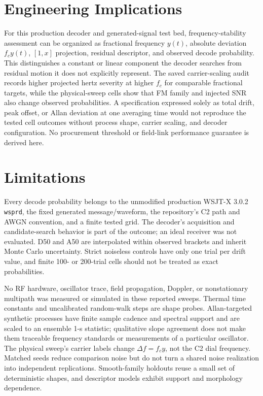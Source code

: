 \documentclass[conference]{IEEEtran}
\begin{document}
\section{Engineering Implications}
For this production decoder and generated-signal test bed, frequency-stability assessment can be organized as fractional frequency $y(t)$, absolute deviation $f_cy(t)$, $[1,x]$ projection, residual descriptor, and observed decode probability. This distinguishes a constant or linear component the decoder searches from residual motion it does not explicitly represent. The saved carrier-scaling audit records higher projected hertz severity at higher $f_c$ for comparable fractional targets, while the physical-sweep cells show that FM family and injected SNR also change observed probabilities. A specification expressed solely as total drift, peak offset, or Allan deviation at one averaging time would not reproduce the tested cell outcomes without process shape, carrier scaling, and decoder configuration. No procurement threshold or field-link performance guarantee is derived here.

\section{Limitations}
Every decode probability belongs to the unmodified production WSJT-X 3.0.2 \texttt{wsprd}, the fixed generated message/waveform, the repository's C2 path and AWGN convention, and a finite tested grid. The decoder's acquisition and candidate-search behavior is part of the outcome; an ideal receiver was not evaluated. D50 and A50 are interpolated within observed brackets and inherit Monte Carlo uncertainty. Strict noiseless controls have only one trial per drift value, and finite 100- or 200-trial cells should not be treated as exact probabilities.

No RF hardware, oscillator trace, field propagation, Doppler, or nonstationary multipath was measured or simulated in these reported sweeps. Thermal time constants and uncalibrated random-walk steps are shape probes. Allan-targeted synthetic processes have finite sample cadence and spectral support and are scaled to an ensemble 1-s statistic; qualitative slope agreement does not make them traceable frequency standards or measurements of a particular oscillator. The physical sweep's carrier labels change $\Delta f=f_cy$, not the C2 dial frequency. Matched seeds reduce comparison noise but do not turn a shared noise realization into independent replications. Smooth-family holdouts reuse a small set of deterministic shapes, and descriptor models exhibit support and morphology dependence.
\end{document}
